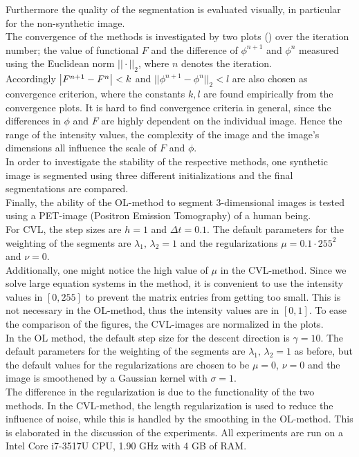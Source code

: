 Furthermore the quality of the segmentation is evaluated visually, in particular for the non-synthetic image.\\
The convergence of the methods is investigated by two plots () over the iteration number; the value of functional $F$ and the difference of $\phi^{n+1}$ and $\phi^n$ measured using the Euclidean norm $||\cdot||_2$, where $n$ denotes the iteration.\\
Accordingly $\left| {F^{n+1}-F^n} \right|<k$ and $||\phi^{n+1}-\phi^{n}||_2<l$ are also chosen as convergence criterion, where the constants $k,l$ are found empirically from the convergence plots. It is hard to find convergence criteria in general, since the differences in $\phi$ and $F$ are highly dependent on the individual image. Hence the range of the intensity values, the complexity of the image and the image's dimensions all influence the scale of $F$ and $\phi$.\\
In order to investigate the stability of the respective methods, one synthetic image is segmented using three different initializations and the final segmentations are compared.\\
Finally, the ability of the OL-method to segment 3-dimensional images is tested using a PET-image (Positron Emission Tomography) of a human being.\\

For CVL, the step sizes are $h=1$ and $\Delta t=0.1$. The default parameters for the weighting of the segments are $\lambda_1,\,\lambda_2 = 1$ and the regularizations $\mu = 0.1\cdot 255^2$ and $\nu = 0$.\\
Additionally, one might notice the high value of $\mu$ in the CVL-method. Since we solve large equation systems in the method, it is convenient to use the intensity values in $[0,255]$ to prevent the matrix entries from getting too small. This is not necessary in the OL-method, thus the intensity values are in $[0,1]$. To ease the comparison of the figures, the CVL-images are normalized in the plots.\\
In the OL method, the default step size for the descent direction is $\gamma = 10$. The default parameters for the weighting of the segments are $\lambda_1,\,\lambda_2 = 1$ as before, but the default values for the regularizations are chosen to be $\mu=0$, $\nu=0$ and the image is smoothened by a Gaussian kernel with $\sigma = 1$. \\
The difference in the regularization is due to the functionality of the two methods. In the CVL-method, the length regularization is used to reduce the influence of noise, while this is handled by the smoothing in the OL-method. This is elaborated in the discussion of the experiments.
All experiments are run on a Intel Core i7-3517U CPU, 1.90 GHz with 4 GB of RAM.\\


